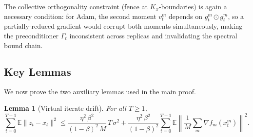 \documentclass{article}
\newtheorem{lemma}[theorem]{Lemma}
\begin{document}
The collective orthogonality constraint (fence at $K_x$-boundaries) is
again a necessary condition: for Adam, the second moment $v_t^m$ depends
on $g_t^m \odot g_t^m$, so a partially-reduced gradient would corrupt both
moments simultaneously, making the preconditioner $\Gamma_t$ inconsistent
across replicas and invalidating the spectral bound chain.

\subsection{Key Lemmas}
\label{sec:key_lemmas}

We now prove the two auxiliary lemmas used in the main proof.

\begin{lemma}[Virtual iterate drift]
\label{lem:virt_drift}
For all $T \geq 1$,
\begin{equation}
\sum_{t=0}^{T-1}\mathbb{E}\|z_t - x_t\|^2
\leq \frac{\eta^2\,\beta^2}{(1-\beta)^2\,M}\,T\,\sigma^2
   + \frac{\eta^2\,\beta^2}{(1-\beta)^2}\sum_{t=0}^{T-1}
   \mathbb{E}\left\|\frac{1}{M}\sum_m\nabla f_m(x_t^m)\right\|^2.
\label{eq:lem_virt_statement}
\end{equation}
\end{lemma}
\end{document}
